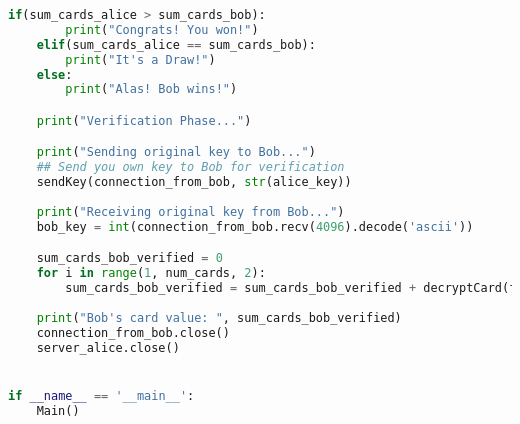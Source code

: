 \documentclass{article}
\begin{document}
\begin{lstlisting}[language=Python, caption=CVM.py]
    if(sum_cards_alice > sum_cards_bob):
        print("Congrats! You won!")
    elif(sum_cards_alice == sum_cards_bob):
        print("It's a Draw!")
    else:
        print("Alas! Bob wins!")

    print("Verification Phase...")

    print("Sending original key to Bob...")
    ## Send you own key to Bob for verification
    sendKey(connection_from_bob, str(alice_key))
    
    print("Receiving original key from Bob...")
    bob_key = int(connection_from_bob.recv(4096).decode('ascii'))

    sum_cards_bob_verified = 0
    for i in range(1, num_cards, 2):
        sum_cards_bob_verified = sum_cards_bob_verified + decryptCard(final_deck_before_individual_keys[i], bob_key)
    
    print("Bob's card value: ", sum_cards_bob_verified)
    connection_from_bob.close()
    server_alice.close()


if __name__ == '__main__':
    Main()

\end{lstlisting}
\end{document}
